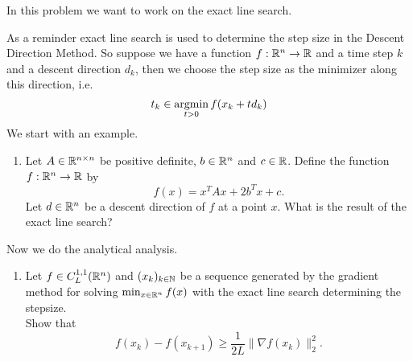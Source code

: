 \documentclass{ExerciseSheet}
\newif\ifsolutions
\begin{document}
\begin{problem}
In this problem we want to work on the exact line search. 

As a reminder exact line search is used to determine the step size in the Descent Direction Method.  
So suppose we have a function $f:\mathbb{R}^n \rightarrow \mathbb{R}$ and a time step $k$ and a descent direction $d_k$, then we choose the step size as the minimizer along this direction,  i.e.
\begin{equation*}
    t_k \in \operatorname*{argmin}_{t>0} f(x_k+td_k)
\end{equation*}
\renewcommand{\labelenumi}{\alph{enumi})}
We start with an example. 
\begin{enumerate}
    \item Let $A\in \mathbb{R}^{n\times n}$ be positive definite, $b\in \mathbb{R}^n$ and $c\in \mathbb{R}$. Define the function $f:\mathbb{R}^n \rightarrow \mathbb{R}$ by $$f(x)=x^TAx + 2b^Tx +c .$$ Let $d\in \mathbb{R}^n$ be a descent direction of $f$ at a point $x$. What is the result of the exact line search? 
\end{enumerate}
\noindent Now we do the analytical analysis.
\begin{enumerate}[resume]
    \item Let $f\in C^{1,1}_L(\mathbb{R}^n)$ and $(x_k)_{k\in \mathbb{N}}$ be a sequence generated by the gradient method for solving $\min_{x\in \mathbb{R}^n} f(x)$ with the exact line search determining the stepsize. \\
    Show that \begin{equation*}
        f(x_k) - f(x_{k+1}) \geq \frac{1}{2L} \|\nabla f(x_k)\|_2^2.
    \end{equation*}
\end{enumerate}
\end{problem}
\ifsolutions
\vskip 0.3cm
\end{document}
